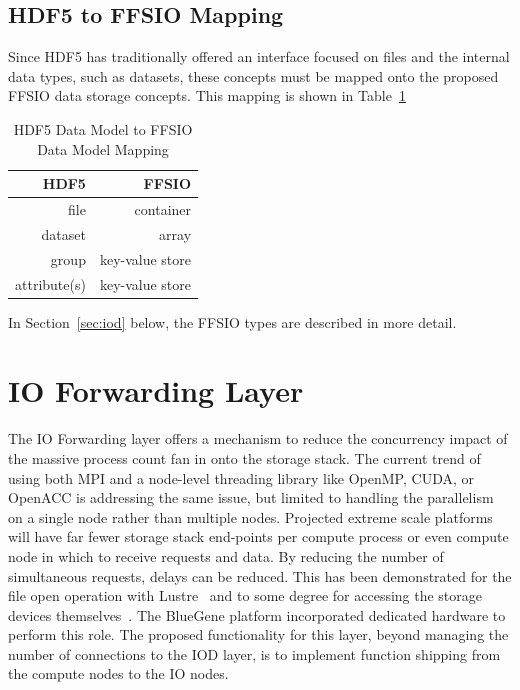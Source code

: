 \documentclass[conference]{IEEEtran} \pdfpagewidth=8.5in
\begin{document}
\subsection{HDF5 to FFSIO Mapping}
\label{sec:hdf-to-ffsio}

Since HDF5 has traditionally offered an interface focused on files and the
internal data types, such as datasets, these concepts must be mapped onto the
proposed FFSIO data storage concepts.  This mapping is shown in
Table~\ref{tab:mapping}

\begin{table}[ht]
    \centering
    \caption[HDF5 to FFSIO Mapping]{HDF5 Data Model to FFSIO Data Model Mapping}
    \bigskip

    \begin{tabular}{|r|r|}
\hline
HDF5 & FFSIO\\
\hline
file & container \\
dataset & array \\
group & key-value store \\
attribute(s) & key-value store \\
\hline
    \end{tabular}
    \label{tab:mapping}
\end{table}

In Section~\ref{sec:iod} below, the FFSIO types are described in more detail.

\section{IO Forwarding Layer}
\label{sec:iof}

The IO Forwarding layer offers a mechanism to reduce the concurrency impact of
the massive process count fan in onto the storage stack. The current trend of
using both MPI and a node-level threading library like OpenMP, CUDA, or OpenACC
is addressing the same issue, but limited to handling the parallelism on a
single node rather than multiple nodes. Projected extreme scale platforms will
have far fewer storage stack end-points per compute process or even compute
node in which to receive requests and data. By reducing the number of
simultaneous requests, delays can be reduced. This has been demonstrated for
the file open operation with Lustre~\cite{lofstead:2009:adaptable} and to some
degree for accessing the storage devices
themselves~\cite{lofstead:2010:io-variability}.  The BlueGene platform
incorporated dedicated hardware to perform this role. The proposed
functionality for this layer, beyond managing the number of connections to the
IOD layer, is to implement function shipping from the compute nodes to the IO
nodes.
\end{document}
